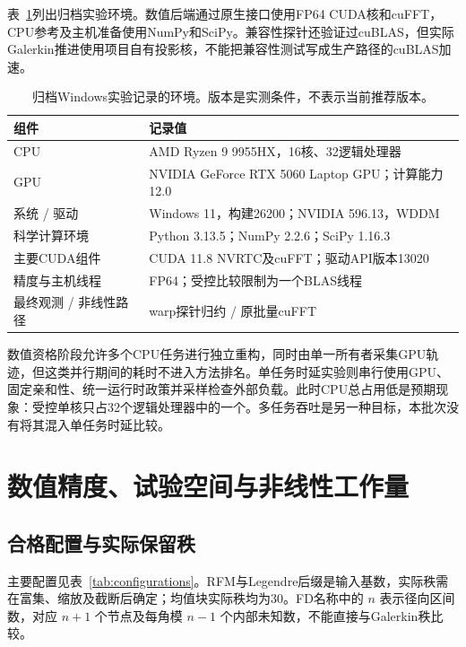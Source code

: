 表~\ref{tab:hardware}列出归档实验环境。数值后端通过原生接口使用FP64 CUDA核和cuFFT，CPU参考及主机准备使用NumPy和SciPy。兼容性探针还验证过cuBLAS，但实际Galerkin推进使用项目自有投影核，不能把兼容性测试写成生产路径的cuBLAS加速。

\begin{table}[tbp]
\centering\small
\caption{归档Windows实验记录的环境。版本是实测条件，不表示当前推荐版本。}
\label{tab:hardware}
\begin{tabularx}{\linewidth}{@{}lX@{}}
\toprule
组件 & 记录值 \\
\midrule
CPU & AMD Ryzen 9 9955HX，16核、32逻辑处理器 \\
GPU & NVIDIA GeForce RTX 5060 Laptop GPU；计算能力12.0 \\
系统 / 驱动 & Windows 11，构建26200；NVIDIA 596.13，WDDM \\
科学计算环境 & Python 3.13.5；NumPy 2.2.6；SciPy 1.16.3 \\
主要CUDA组件 & CUDA 11.8 NVRTC及cuFFT；驱动API版本13020 \\
精度与主机线程 & FP64；受控比较限制为一个BLAS线程 \\
最终观测 / 非线性路径 & warp探针归约 / 原批量cuFFT \\
\bottomrule
\end{tabularx}
\end{table}

数值资格阶段允许多个CPU任务进行独立重构，同时由单一所有者采集GPU轨迹，但这类并行期间的耗时不进入方法排名。单任务时延实验则串行使用GPU、固定亲和性、统一运行时政策并采样检查外部负载。此时CPU总占用低是预期现象：受控单核只占32个逻辑处理器中的一个。多任务吞吐是另一种目标，本批次没有将其混入单任务时延比较。

\section{数值精度、试验空间与非线性工作量}
\label{sec:accuracy-results}

\subsection{合格配置与实际保留秩}

主要配置见表~\ref{tab:configurations}。RFM与Legendre后缀是输入基数，实际秩需在富集、缩放及截断后确定；均值块实际秩均为30。FD名称中的 $n$ 表示径向区间数，对应 $n+1$ 个节点及每角模 $n-1$ 个内部未知数，不能直接与Galerkin秩比较。

